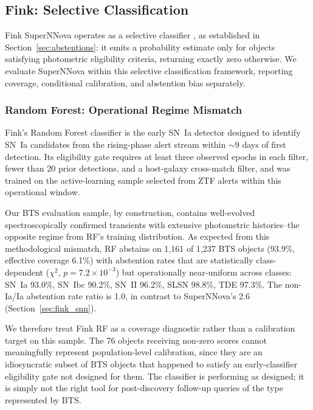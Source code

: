 \documentclass[twocolumn]{aastex631}
\begin{document}
\subsection{Fink: Selective Classification} \label{sec:fink}

Fink SuperNNova operates as a selective classifier \citep{geifman2017},
as established in Section~\ref{sec:abstentions}: it emits a probability
estimate only for objects satisfying photometric eligibility criteria,
returning exactly zero otherwise. We evaluate SuperNNova within this
selective classification framework, reporting coverage, conditional
calibration, and abstention bias separately.

\subsubsection{Random Forest: Operational Regime Mismatch} \label{sec:fink_rf}

Fink's Random Forest classifier \citep{leoni2022} is the early SN~Ia detector designed to identify SN~Ia candidates from the rising-phase alert stream within $\sim$9 days of first detection. Its eligibility gate requires at least three observed epochs in each filter, fewer than 20 prior detections, and a host-galaxy cross-match filter, and was trained on the active-learning sample selected from ZTF alerts within this operational window.

Our BTS evaluation sample, by construction, contains well-evolved spectroscopically confirmed transients with extensive photometric histories--the opposite regime from RF's training distribution. As expected from this methodological mismatch, RF abstains on 1,161 of 1,237 BTS objects (93.9\%, effective coverage 6.1\%) with abstention rates that are statistically class-dependent ($\chi^2$, $p = 7.2 \times 10^{-3}$) but operationally near-uniform across classes: SN~Ia 93.0\%, SN~Ibc 90.2\%, SN~II 96.2\%, SLSN 98.8\%, TDE 97.3\%. The non-Ia/Ia abstention rate ratio is 1.0, in contrast to SuperNNova's 2.6 (Section~\ref{sec:fink_snn}).

We therefore treat Fink RF as a coverage diagnostic rather than a calibration target on this sample. The 76 objects receiving non-zero scores cannot meaningfully represent population-level calibration, since they are an idiosyncratic subset of BTS objects that happened to satisfy an early-classifier eligibility gate not designed for them. The classifier is performing as designed; it is simply not the right tool for post-discovery follow-up queries of the type represented by BTS.
\end{document}

